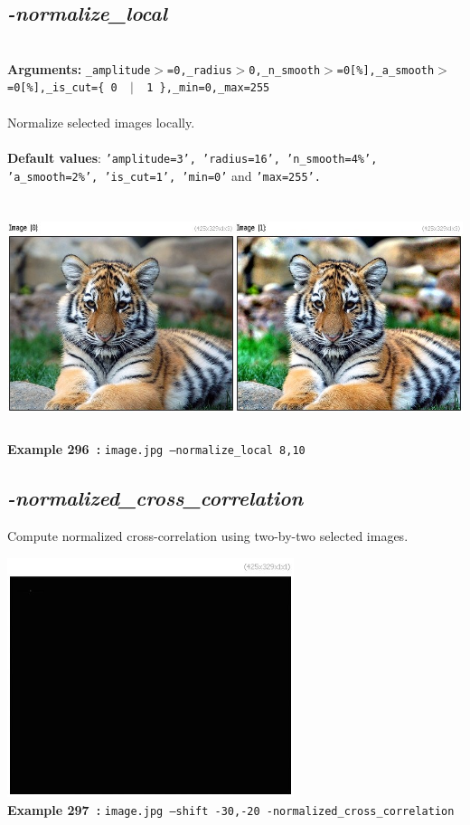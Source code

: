 \documentclass[a4paper,11pt,twoside]{book}
\begin{document}
\subsection{\emph{-normalize\_local} }\vspace*{-0.5em}
~\\\textbf{Arguments: } 
{\small \texttt{\_amplitude$>$=0,\_radius$>$0,\_n\_smooth$>$=0[\%],\_a\_smooth$>$=0[\%],\_is\_cut=\{ 0 ~$|$~ 1 \},\_min=0,\_max=255}}\\~\\
Normalize selected images locally.
~\\~\\\textbf{Default values}: {\small \texttt{'amplitude=3', 'radius=16', 'n\_smooth=4\%', 'a\_smooth=2\%', 'is\_cut=1', 'min=0'} and \texttt{'max=255'.}}
\begin{center}\includegraphics[keepaspectratio=true,height=7cm,width=\textwidth]{img/gmic_def296.jpg}\\
{\footnotesize \textbf{Example 296~:} \texttt{image.jpg --normalize\_local 8,10}}
\end{center}

\subsection{\emph{-normalized\_cross\_correlation} }\vspace*{-0.5em}
Compute normalized cross-correlation using two-by-two selected images.
\begin{center}\includegraphics[keepaspectratio=true,height=7cm,width=\textwidth]{img/gmic_def297.jpg}\\
{\footnotesize \textbf{Example 297~:} \texttt{image.jpg --shift -30,-20 -normalized\_cross\_correlation}}
\end{center}
\end{document}

